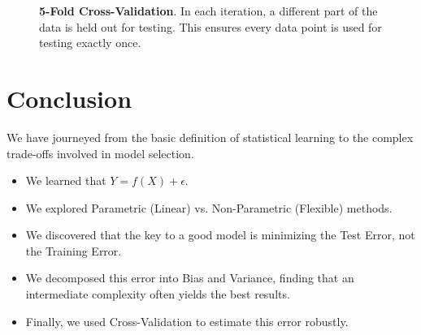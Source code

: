 \documentclass[11pt, a4paper]{article}
\begin{document}
\begin{figure}[h]
    \centering
    \caption{\textbf{5-Fold Cross-Validation}. In each iteration, a different part of the data is held out for testing. This ensures every data point is used for testing exactly once.}
\end{figure}

\section{Conclusion}
We have journeyed from the basic definition of statistical learning to the complex trade-offs involved in model selection.
\begin{itemize}
    \item We learned that $Y = f(X) + \epsilon$.
    \item We explored Parametric (Linear) vs. Non-Parametric (Flexible) methods.
    \item We discovered that the key to a good model is minimizing the Test Error, not the Training Error.
    \item We decomposed this error into Bias and Variance, finding that an intermediate complexity often yields the best results.
    \item Finally, we used Cross-Validation to estimate this error robustly.
\end{itemize}
\end{document}
